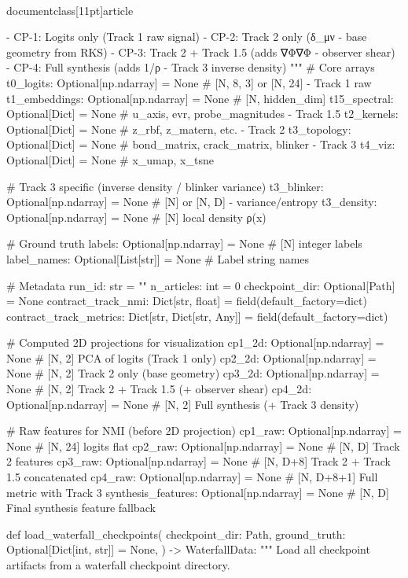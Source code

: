 \\documentclass[11pt]{article}
\begin{document}
\begin{CodeBlock}
    - CP-1: Logits only (Track 1 raw signal)
    - CP-2: Track 2 only (δ_μν - base geometry from RKS)
    - CP-3: Track 2 + Track 1.5 (adds ∇Φ∇Φ - observer shear)
    - CP-4: Full synthesis (adds 1/ρ - Track 3 inverse density)
    """
    # Core arrays
    t0_logits: Optional[np.ndarray] = None          # [N, 8, 3] or [N, 24] - Track 1 raw
    t1_embeddings: Optional[np.ndarray] = None      # [N, hidden_dim]
    t15_spectral: Optional[Dict] = None             # u_axis, evr, probe_magnitudes - Track 1.5
    t2_kernels: Optional[Dict] = None               # z_rbf, z_matern, etc. - Track 2
    t3_topology: Optional[Dict] = None              # bond_matrix, crack_matrix, blinker - Track 3
    t4_viz: Optional[Dict] = None                   # x_umap, x_tsne

    # Track 3 specific (inverse density / blinker variance)
    t3_blinker: Optional[np.ndarray] = None         # [N] or [N, D] - variance/entropy
    t3_density: Optional[np.ndarray] = None         # [N] local density ρ(x)

    # Ground truth
    labels: Optional[np.ndarray] = None             # [N] integer labels
    label_names: Optional[List[str]] = None         # Label string names

    # Metadata
    run_id: str = ""
    n_articles: int = 0
    checkpoint_dir: Optional[Path] = None
    contract_track_nmi: Dict[str, float] = field(default_factory=dict)
    contract_track_metrics: Dict[str, Dict[str, Any]] = field(default_factory=dict)

    # Computed 2D projections for visualization
    cp1_2d: Optional[np.ndarray] = None             # [N, 2] PCA of logits (Track 1 only)
    cp2_2d: Optional[np.ndarray] = None             # [N, 2] Track 2 only (base geometry)
    cp3_2d: Optional[np.ndarray] = None             # [N, 2] Track 2 + Track 1.5 (+ observer shear)
    cp4_2d: Optional[np.ndarray] = None             # [N, 2] Full synthesis (+ Track 3 density)

    # Raw features for NMI (before 2D projection)
    cp1_raw: Optional[np.ndarray] = None            # [N, 24] logits flat
    cp2_raw: Optional[np.ndarray] = None            # [N, D] Track 2 features
    cp3_raw: Optional[np.ndarray] = None            # [N, D+8] Track 2 + Track 1.5 concatenated
    cp4_raw: Optional[np.ndarray] = None            # [N, D+8+1] Full metric with Track 3
    synthesis_features: Optional[np.ndarray] = None # [N, D] Final synthesis feature fallback


def load_waterfall_checkpoints(
    checkpoint_dir: Path,
    ground_truth: Optional[Dict[int, str]] = None,
) -> WaterfallData:
    """
    Load all checkpoint artifacts from a waterfall checkpoint directory.


\end{CodeBlock}
\end{document}
